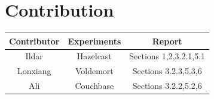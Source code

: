 \documentclass[a4paper]{article}
\begin{document}
\section*{Contribution}

\begin{table}[h]
	\centering
	\begin{tabular}{|c|c|c|}
		\hline
		\rowcolor{light-gray} \textbf{Contributor} & \textbf{Experiments} & \textbf{Report} \\ \hline
		Ildar & Hazelcast & Sections 1,2,3.2.1,5.1 \\ \hline
		Lonxiang & Voldemort & Sections 3.2.3,5.3,6  \\ \hline
		Ali & Couchbase & Sections 3.2.2,5.2,6 \\ \hline
	\end{tabular}
\end{table}

\printbibliography
\end{document}
